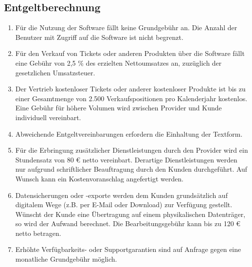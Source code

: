 \documentclass{terms}
\begin{document}
\subsection{Entgeltberechnung}
\label{entgelt}
\begin{enumerate}
\item Für die Nutzung der Software fällt keine Grundgebühr an. Die Anzahl der Benutzer mit Zugriff auf die Software ist nicht begrenzt.
\item Für den Verkauf von Tickets oder anderen Produkten über die Software fällt eine Gebühr von 2,5 \% des erzielten Nettoumsatzes an, zuzüglich der gesetzlichen Umsatzsteuer.
\item Der Vertrieb kostenloser Tickets oder anderer kostenloser Produkte ist bis zu einer Gesamtmenge von 2.500 Verkaufspositionen pro Kalenderjahr kostenlos. Eine Gebühr für höhere Volumen wird zwischen Provider und Kunde individuell vereinbart.
\item Abweichende Entgeltvereinbarungen erfordern die Einhaltung der Textform.
\item Für die Erbringung zusätzlicher Dienstleistungen durch den Provider wird ein Stundensatz von 80 € netto vereinbart. Derartige Dienstleistungen werden nur aufgrund schriftlicher Beauftragung durch den Kunden durchgeführt. Auf Wunsch kann ein Kostenvoranschlag angefertigt werden.
\item Datensicherungen oder -exporte werden dem Kunden grundsätzlich auf digitalem Wege (z.B. per E-Mail oder Download) zur Verfügung gestellt. Wünscht der Kunde eine Übertragung auf einem physikalischen Datenträger, so wird der Aufwand berechnet. Die Bearbeitungsgebühr kann bis zu 120 € netto betragen.
\item Erhöhte Verfügbarkeits- oder Supportgarantien sind auf Anfrage gegen eine monatliche Grundgebühr möglich.
\end{enumerate}
\end{document}
